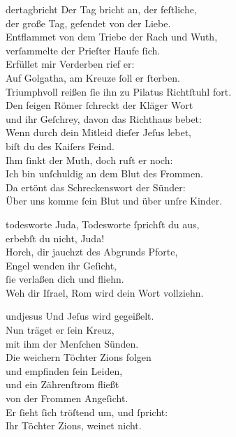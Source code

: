 \documentclass[shorttitlesize=55,tocstyle=ref-genre]{ees}
\begin{document}
{\begin{movement}{dertagbricht}
  \voice[Basso]
  Der Tag bricht an, der feſtliche,\\
  der große Tag, geſendet von der Liebe.\\
  Entflammet von dem Triebe der Rach und Wuth,\\
  verſammelte der Prieſter Haufe ſich.\\
  Erfüllet mir Verderben rief er:\\
  Auf Golgatha, am Kreuze ſoll er ſterben.\\
  Triumphvoll reißen ſie ihn zu Pilatus Richtſtuhl fort.\\
  Den feigen Römer ſchreckt der Kläger Wort\\
  und ihr Geſchrey, davon das Richthaus bebet:\\
  Wenn durch dein Mitleid dieſer Jeſus lebet,\\
  biſt du des Kaiſers Feind.\\
  Ihm ſinkt der Muth, doch ruft er noch:\\
  Ich bin unſchuldig an dem Blut des Frommen.\\
  Da ertönt das Schreckenswort der Sünder:\\
  Über uns komme ſein Blut und über unſre Kinder.
\end{movement}

\clearpage
\begin{movement}{todesworte}
  \voice[Coro]
  Juda, Todesworte ſprichſt du aus,\\
  erbebſt du nicht, Juda!\\
  Horch, dir jauchzt des Abgrunds Pforte,\\
  Engel wenden ihr Geſicht,\\
  ſie verlaßen dich und fliehn.\\
  Weh dir Iſrael, Rom wird dein Wort vollziehn.
\end{movement}

\begin{movement}{undjesus}
  \voice[Tenore]
  Und Jeſus wird gegeißelt.\\
  Nun träget er ſein Kreuz,\\
  mit ihm der Menſchen Sünden.\\
  Die weichern Töchter Zions folgen\\
  und empfinden ſein Leiden,\\
  und ein Zährenſtrom fließt\\
  von der Frommen Angeſicht.\\
  Er ſieht ſich tröſtend um, und ſpricht:\\
  Ihr Töchter Zions, weinet nicht.
\end{movement}

}
\end{document}
